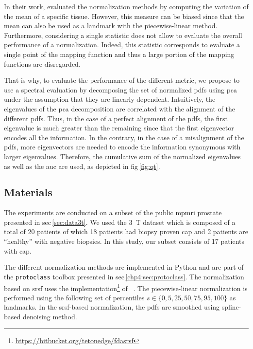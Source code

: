 In their work, \citeauthor{Nyul2000} evaluated the normalization methods by computing the variation of the mean of a specific tissue.
However, this measure can be biased since that the mean can also be used as a landmark with the piecewise-linear method.
Furthermore, considering a single statistic does not allow to evaluate the overall performance of a normalization.
Indeed, this statistic corresponds to evaluate a single point of the mapping function and thus a large portion of the mapping functions are disregarded. 

That is why, to evaluate the performance of the different metric, we propose to use a spectral evaluation by decomposing the set of normalized \ac{pdf}s using \ac{pca} under the assumption that they are linearly dependent. 
Intuitively, the eigenvalues of the \ac{pca} decomposition are correlated with the alignment of the different \acp{pdf}.
Thus, in the case of a perfect alignment of the \ac{pdf}s, the first eigenvalue is much greater than the remaining since that the first eigenvector encodes all the information.
In the contrary, in the case of a misalignment of the \ac{pdf}s, more eigenvectors are needed to encode the information synonymous with larger eigenvalues.
Therefore, the cumulative sum of the normalized eigenvalues as well as the \ac{auc} are used, as depicted in \acs{fig}\,\ref{fig:qt}.

\subsection{Materials}\label{subsec:chp5:T2-norm:Exp-res}

The experiments are conducted on a subset of the public \ac{mpmri} prostate presented in \acs{sec}\,\ref{sec:data3t}.
We used the \SI{3}{\tesla} dataset which is composed of a total of 20 patients of which 18 patients had biopsy proven \ac{cap} and 2 patients are ``healthy'' with negative biopsies. 
In this study, our subset consists of 17 patients with \ac{cap}.

The different normalization methods are implemented in Python and are part of the \texttt{protoclass} toolbox presented in \acs{sec}\,\ref{chp4:sec:protoclass}.
The normalization based on \ac{srsf} uses the implementation\footnote{\url{https://bitbucket.org/tetonedge/fdasrsf}} of \citeauthor{Tucker2013}~\cite{Tucker2013}.
The piecewise-linear normalization is performed using the following set of percentiles $s \in \{0, 5, 25, 50, 75, 95, 100 \}$ as landmarks.
In the \ac{srsf}-based normalization, the \acp{pdf} are smoothed using spline-based denoising method.

